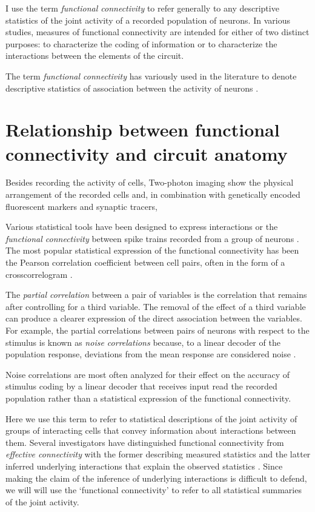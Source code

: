 I use the term \emph{functional connectivity} to refer generally to any descriptive statistics of the joint activity of a recorded population of neurons. 
In various studies, measures of functional connectivity are intended for either of two distinct purposes: to characterize the coding of information or to characterize the interactions between the elements of the circuit. 

The term \emph{functional connectivity} has variously used in the literature to denote descriptive statistics of  association between the activity of neurons \cite{Feldt:2011}. 


\section{Relationship between functional connectivity and circuit anatomy}

Besides recording the activity of cells, Two-photon imaging show the physical arrangement of the recorded cells and, in combination with genetically encoded fluorescent markers and synaptic tracers, 




Various statistical tools have been designed to express interactions or the \emph{functional connectivity} between spike trains recorded from a group of neurons \citep{Brown:2004}. The most popular statistical expression of the functional connectivity has been the Pearson correlation coefficient between cell pairs, often in the form of a crosscorrelogram \citep{Gerstein:1969, Denman:2013, Sadovsky:2014}. 

The \emph{partial correlation} between a pair of variables is the correlation that remains after controlling for a third variable. The removal of the effect of a third variable can produce a clearer expression of the direct association between the variables.
For example, the partial correlations between pairs of neurons with respect to the stimulus is known as \emph{noise correlations} because, to a linear decoder of the population response, deviations from the mean response are considered noise \citep{Zohary:1994}. 

Noise correlations are most often analyzed for their effect on the accuracy of stimulus coding by a linear decoder that receives input read the recorded population \citep{Averbeck:2006,Ecker:2011} rather than a statistical expression of the functional connectivity. 



Here we use this term to refer to statistical descriptions of the joint activity of groups of interacting cells that convey information about interactions between them.  Several investigators have distinguished functional connectivity from \emph{effective connectivity} with the former describing measured statistics and the latter inferred underlying interactions that explain the observed statistics \citep{Aertsen:1989,Friston:2011}. Since making the claim of the inference of underlying interactions is difficult to defend, we will will use the `functional connectivity' to refer to all statistical summaries of the joint activity. 

